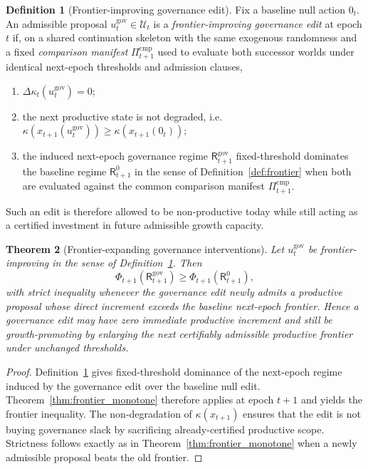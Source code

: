 \documentclass[11pt]{article}
\newtheorem{theorem}{Theorem}[section]
\theoremstyle{definition}
\newtheorem{definition}[theorem]{Definition}
\newcommand{\1}{\mathbf{1}}
\begin{document}
\begin{definition}[Frontier-improving governance edit]\label{def:gov_investment}
Fix a baseline null action $0_t$. An admissible proposal $u_t^{\mathrm{gov}}\in\mathcal U_t$ is a \emph{frontier-improving governance edit} at epoch $t$ if, on a shared continuation skeleton with the same exogenous randomness and a fixed \emph{comparison manifest} $\Pi_{t+1}^{\mathrm{cmp}}$ used to evaluate both successor worlds under identical next-epoch thresholds and admission clauses,
\begin{enumerate}[label=(\roman*), leftmargin=2em]
  \item $\Delta\kappa_t(u_t^{\mathrm{gov}})=0$;
  \item the next productive state is not degraded, i.e. $\kappa(x_{t+1}(u_t^{\mathrm{gov}}))\ge \kappa(x_{t+1}(0_t))$;
  \item the induced next-epoch governance regime $\mathsf R_{t+1}^{\mathrm{gov}}$ fixed-threshold dominates the baseline regime $\mathsf R_{t+1}^{0}$ in the sense of Definition~\ref{def:frontier} when both are evaluated against the common comparison manifest $\Pi_{t+1}^{\mathrm{cmp}}$.
\end{enumerate}
Such an edit is therefore allowed to be non-productive today while still acting as a certified investment in future admissible growth capacity.
\end{definition}

\begin{theorem}[Frontier-expanding governance interventions]\label{thm:gov_investment}
Let $u_t^{\mathrm{gov}}$ be frontier-improving in the sense of Definition~\ref{def:gov_investment}. Then
\[
\Phi_{t+1}(\mathsf R_{t+1}^{\mathrm{gov}})\ge \Phi_{t+1}(\mathsf R_{t+1}^{0}),
\]
with strict inequality whenever the governance edit newly admits a productive proposal whose direct increment exceeds the baseline next-epoch frontier. Hence a governance edit may have zero immediate productive increment and still be growth-promoting by enlarging the next certifiably admissible productive frontier under unchanged thresholds.
\end{theorem}

\begin{proof}
Definition~\ref{def:gov_investment} gives fixed-threshold dominance of the next-epoch regime induced by the governance edit over the baseline null edit. Theorem~\ref{thm:frontier_monotone} therefore applies at epoch $t+1$ and yields the frontier inequality. The non-degradation of $\kappa(x_{t+1})$ ensures that the edit is not buying governance slack by sacrificing already-certified productive scope. Strictness follows exactly as in Theorem~\ref{thm:frontier_monotone} when a newly admissible proposal beats the old frontier.
\end{proof}
\end{document}
